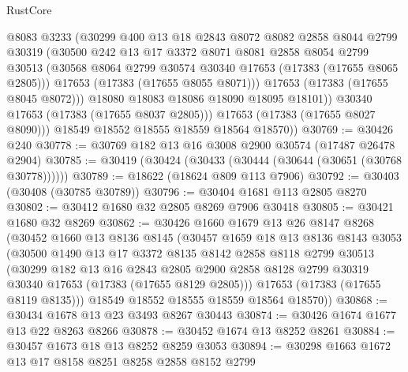 \begin{lexlean}{RustCore}
\begin{coremodule}
                @8083
                @3233
                (@30299
                  @400
                  @13
                  @18
                  @2843
                  @8072
                  @8082
                  @2858
                  @8044
                  @2799
                  @30319
                  (@30500
                    @242
                    @13
                    @17
                    @3372
                    @8071
                    @8081
                    @2858
                    @8054
                    @2799
                    @30513
                    (@30568 @8064 @2799 @30574 @30340 @17653 (@17383 (@17655 @8065 @2805)))
                    @17653
                    (@17383 (@17655 @8055 @8071)))
                  @17653
                  (@17383 (@17655 @8045 @8072)))
                @18080
                @18083
                @18086
                @18090
                @18095
                @18101))
            @30340
            @17653
            (@17383 (@17655 @8037 @2805)))
          @17653
          (@17383 (@17655 @8027 @8090)))
        @18549
        @18552
        @18555
        @18559
        @18564
        @18570))
@30769 := @30426 @240
@30778 := @30769 @182 @13 @16 @3008 @2900 @30574 (@17487 @26478 @2904)
@30785 := @30419 (@30424 (@30433 (@30444 (@30644 (@30651 (@30768 @30778))))))
@30789 := @18622 (@18624 @809 @113 @7906)
@30792 := @30403 (@30408 (@30785 @30789))
@30796 := @30404 @1681 @113 @2805 @8270
@30802 := @30412 @1680 @32 @2805 @8269 @7906 @30418
@30805 := @30421 @1680 @32 @8269
@30862 := @30426
    @1660
    @1679
    @13
    @26
    @8147
    @8268
    (@30452
      @1660
      @13
      @8136
      @8145
      (@30457
        @1659
        @18
        @13
        @8136
        @8143
        @3053
        (@30500
          @1490
          @13
          @17
          @3372
          @8135
          @8142
          @2858
          @8118
          @2799
          @30513
          (@30299
            @182
            @13
            @16
            @2843
            @2805
            @2900
            @2858
            @8128
            @2799
            @30319
            @30340
            @17653
            (@17383 (@17655 @8129 @2805)))
          @17653
          (@17383 (@17655 @8119 @8135)))
        @18549
        @18552
        @18555
        @18559
        @18564
        @18570))
@30868 := @30434 @1678 @13 @23 @3493 @8267 @30443
@30874 := @30426 @1674 @1677 @13 @22 @8263 @8266
@30878 := @30452 @1674 @13 @8252 @8261
@30884 := @30457 @1673 @18 @13 @8252 @8259 @3053
@30894 := @30298 @1663 @1672 @13 @17 @8158 @8251 @8258 @2858 @8152 @2799

\end{coremodule}
\end{lexlean}
